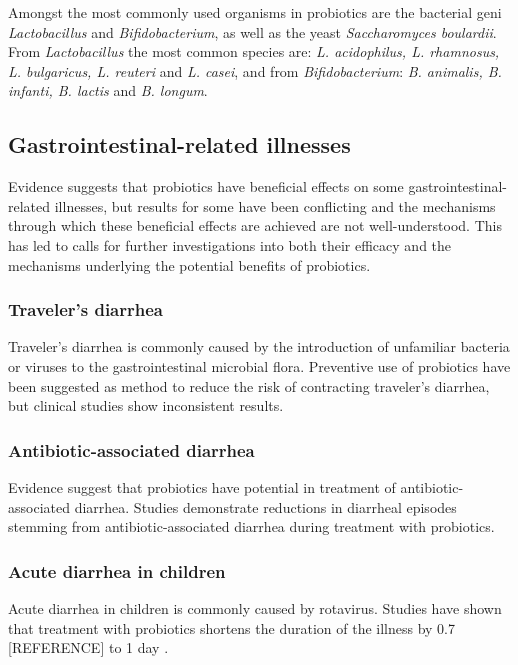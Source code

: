 \documentclass[12pt]{article}
\begin{document}
Amongst the most commonly used organisms in probiotics are the bacterial geni \textit{Lactobacillus} and \textit{Bifidobacterium}, as well as the yeast \textit{Saccharomyces boulardii}.  From \textit{Lactobacillus} the most common species are: \textit{L. acidophilus, L. rhamnosus, L. bulgaricus, L. reuteri} and \textit{L. casei}, and from \textit{Bifidobacterium}: \textit{B. animalis, B. infanti, B. lactis} and \textit{B. longum}\cite{Islam2016}. 


\subsection{Gastrointestinal-related illnesses}
Evidence suggests that probiotics have beneficial effects on some gastrointestinal-related illnesses, but results for some have been conflicting and the mechanisms through which these beneficial effects are achieved are not well-understood\cite{Islam2016}. This has led to calls for further investigations into both their efficacy and the mechanisms underlying the potential benefits of probiotics. 



\subsubsection{Traveler’s diarrhea} 
Traveler’s diarrhea is commonly caused by the introduction of unfamiliar bacteria or viruses to the gastrointestinal microbial flora. Preventive use of probiotics have been suggested as method to reduce the risk of contracting traveler’s diarrhea, but clinical studies show inconsistent results\cite{McFarland2007, Katelaris1995,Hilton1997,Allen2004}. 

\subsubsection{Antibiotic-associated diarrhea}
Evidence suggest that probiotics have potential in treatment of antibiotic-associated diarrhea. Studies demonstrate reductions in diarrheal episodes stemming from antibiotic-associated diarrhea during treatment with probiotics\cite{Cremonini2002,McFarland2006,Hickson2007}. 

\subsubsection{Acute diarrhea in children}
Acute diarrhea in children is commonly caused by rotavirus. Studies have shown that treatment with probiotics shortens the duration of the illness by 0.7 [REFERENCE] to 1 day \cite{Guandalini2000}. 
\end{document}

